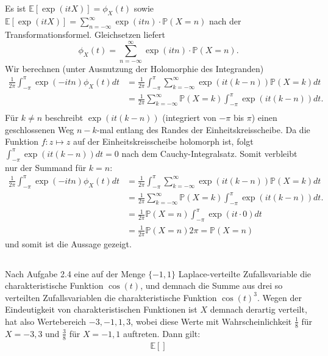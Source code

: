 \documentclass[a4paper]{article}
\begin{document}
\addtocounter{subsection}{1}

\subsection{}

Es ist $\mathds{E}[\exp(itX)] = \phi_X(t)$ sowie $\mathds{E}[\exp(itX)] = \sum_{n = - \infty}^{\infty} \exp(itn) \cdot \mathds{P}(X = n)$ nach der Transformationsformel. Gleichsetzen liefert
\begin{equation*}
    \phi_X(t) = \sum_{n = - \infty}^{\infty} \exp(itn) \cdot \mathds{P}(X = n)\text{.}
\end{equation*}
Wir berechnen (unter Ausnutzung der Holomorphie des Integranden)
\begin{align*}
    \frac{1}{2\pi} \int_{-\pi}^{\pi} \exp(-itn) \phi_X(t) dt
    &= \frac{1}{2 \pi} \int_{-\pi}^{\pi} \sum_{k=-\infty}^{\infty} \exp(it(k-n)) \mathds{P}(X = k) dt\\
    &= \frac{1}{2 \pi} \sum_{k=-\infty}^{\infty} \mathds{P}(X = k)  \int_{-\pi}^{\pi}  \exp(it(k-n)) dt\text{.}\\
\end{align*}
Für $k \neq n$ beschreibt $\exp(it(k-n))$ (integriert von $-\pi$ bis $\pi$) einen geschlossenen Weg $n-k$-mal entlang des Randes der Einheitskreisscheibe. Da die Funktion $f: z \mapsto z$ auf der Einheitskreisscheibe holomorph ist, folgt $\int_{-\pi}^{\pi}  \exp(it(k-n)) dt = 0$ nach dem Cauchy-Integralsatz. Somit verbleibt nur der Summand für $k = n$:
\begin{align*}
    \frac{1}{2\pi} \int_{-\pi}^{\pi} \exp(-itn) \phi_X(t) dt
    &= \frac{1}{2 \pi} \int_{-\pi}^{\pi} \sum_{k=-\infty}^{\infty} \exp(it(k-n)) \mathds{P}(X = k) dt\\
    &= \frac{1}{2 \pi} \sum_{k=-\infty}^{\infty} \mathds{P}(X = k)  \int_{-\pi}^{\pi}  \exp(it(k-n)) dt\text{.}\\
    &= \frac{1}{2 \pi} \mathds{P}(X = n) \int_{-\pi}^{\pi} \exp(i t \cdot 0) dt \\
    &= \frac{1}{2 \pi} \mathds{P}(X = n) 2 \pi = \mathds{P}(X = n)
\end{align*}
und somit ist die Aussage gezeigt.

\subsection{}

Nach Aufgabe 2.4 eine auf der Menge $\{-1,1\}$ Laplace-verteilte Zufallsvariable die charakteristische Funktion $\cos(t)$, und demnach die Summe aus drei so verteilten Zufallsvariablen die charakteristische Funktion $\cos(t)^3$. Wegen der Eindeutigkeit von charakteristischen Funktionen ist $X$ demnach derartig verteilt, hat also Wertebereich $-3, -1, 1, 3$, wobei diese Werte mit Wahrscheinlichkeit $\frac{1}{8}$ für $X=-3,3$ und $\frac{3}{8}$ für $X = -1,1$ auftreten. Dann gilt:
\begin{align*}
    \mathds{E}[]
\end{align*}
\end{document}
